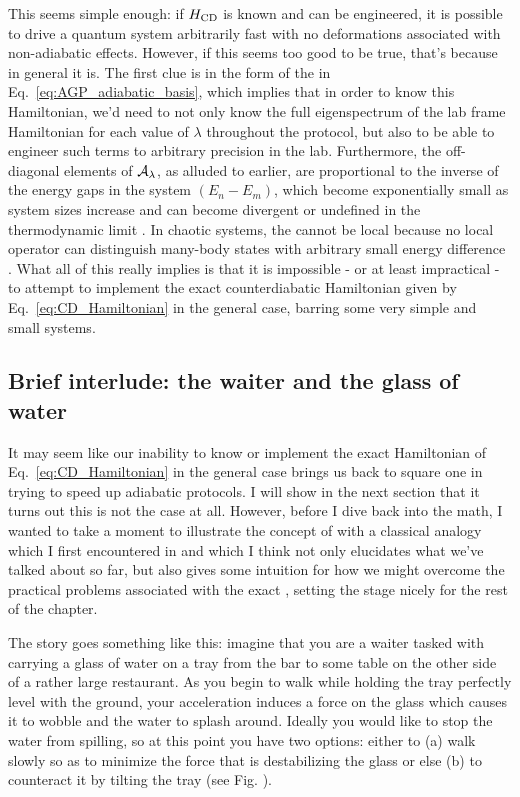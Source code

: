     This seems simple enough: if $H_{\rm CD}$ is known and can be engineered, it is possible to drive a quantum system arbitrarily fast with no deformations associated with non-adiabatic effects. However, if this seems too good to be true, that's because in general it is. The first clue is in the form of the  in Eq.~\eqref{eq:AGP_adiabatic_basis}, which implies that in order to know this  Hamiltonian, we'd need to not only know the full eigenspectrum of the lab frame Hamiltonian for each value of $\lambda$ throughout the protocol, but also to be able to engineer such terms to arbitrary precision in the lab. Furthermore, the off-diagonal elements of $\mathcal{A}_{\lambda}$, as alluded to earlier, are proportional to the inverse of the energy gaps in the system $(E_n - E_m)$, which become exponentially small as system sizes increase and can become divergent or undefined in the thermodynamic limit \cite{kolodrubetz_geometry_2017, jarzynski_geometric_1995}. In chaotic systems, the  cannot be local because no local operator can distinguish many-body states with arbitrary small energy difference \cite{dalessio_quantum_2016}. What all of this really implies is that it is impossible - or at least impractical - to attempt to implement the exact counterdiabatic Hamiltonian given by Eq.~\eqref{eq:CD_Hamiltonian} in the general case, barring some very simple and small systems.

    \subsection{Brief interlude: the waiter and the glass of water}

    It may seem like our inability to know or implement the exact  Hamiltonian of Eq.~\eqref{eq:CD_Hamiltonian} in the general case brings us back to square one in trying to speed up adiabatic protocols. I will show in the next section that it turns out this is not the case at all. However, before I dive back into the math, I wanted to take a moment to illustrate the concept of  with a classical analogy which I first encountered in \cite{sels_minimizing_2017} and which I think not only elucidates what we've talked about so far, but also gives some intuition for how we might overcome the practical problems associated with the exact , setting the stage nicely for the rest of the chapter.
    
    The story goes something like this: imagine that you are a waiter tasked with carrying a glass of water on a tray from the bar to some table on the other side of a rather large restaurant. As you begin to walk while holding the tray perfectly level with the ground, your acceleration induces a force on the glass which causes it to wobble and the water to splash around. Ideally you would like to stop the water from spilling, so at this point you have two options: either to (a) walk slowly so as to minimize the force that is destabilizing the glass or else (b) to counteract it by tilting the tray (see Fig. ). 

